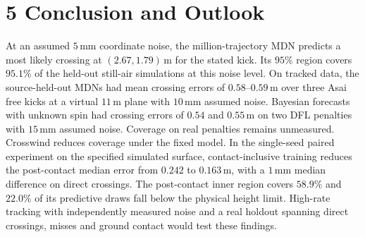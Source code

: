 \section{5 Conclusion and Outlook}

At an assumed $5\,\mathrm{mm}$ coordinate noise, the million-trajectory MDN predicts a most likely crossing at $(2.67,1.79)\,\mathrm{m}$ for the stated kick. Its $95\%$ region covers $95.1\%$ of the held-out still-air simulations at this noise level. On tracked data, the source-held-out MDNs had mean crossing errors of $0.58$--$0.59\,\mathrm{m}$ over three Asai free kicks at a virtual $11\,\mathrm{m}$ plane with $10\,\mathrm{mm}$ assumed noise. Bayesian forecasts with unknown spin had crossing errors of $0.54$ and $0.55\,\mathrm{m}$ on two DFL penalties with $15\,\mathrm{mm}$ assumed noise. Coverage on real penalties remains unmeasured. Crosswind reduces coverage under the fixed model. In the single-seed paired experiment on the specified simulated surface, contact-inclusive training reduces the post-contact median error from $0.242$ to $0.163\,\mathrm{m}$, with a $1\,\mathrm{mm}$ median difference on direct crossings. The post-contact inner region covers $58.9\%$ and $22.0\%$ of its predictive draws fall below the physical height limit. High-rate tracking with independently measured noise and a real holdout spanning direct crossings, misses and ground contact would test these findings.

